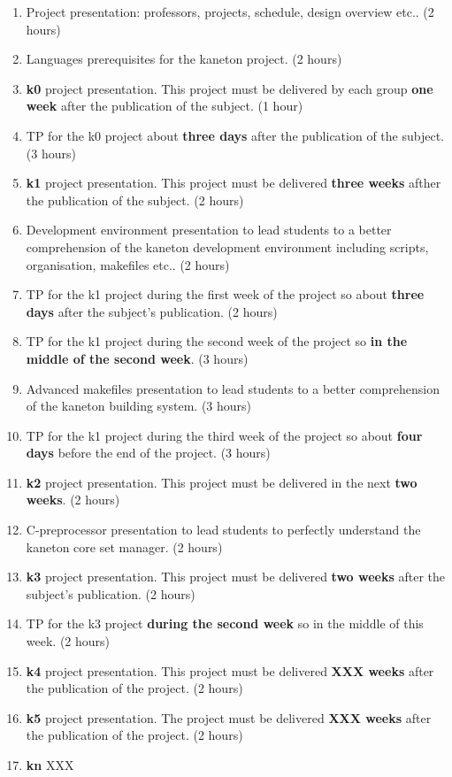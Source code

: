 \begin{multicols}{2}
\begin{enumerate}
  \item
    Project presentation: professors, projects, schedule, design overview
    etc.. (2 hours)
  \item
    Languages prerequisites for the kaneton project. (2 hours)
  \item
    \textbf{k0} project presentation. This project must be delivered by
    each group \textbf{one week} after the publication of the
    subject. (1 hour)
  \item
    TP for the k0 project about \textbf{three days} after the publication of
    the subject. (3 hours)
  \item
    \textbf{k1} project presentation. This project must be delivered
    \textbf{three weeks} afther the publication of the subject. (2 hours)
  \item
    Development environment presentation to lead students to a better
    comprehension of the kaneton development environment including scripts,
    organisation, makefiles etc.. (2 hours)
  \item
    TP for the k1 project during the first week of the project so about
    \textbf{three days} after the subject's publication. (2 hours)
  \item
    TP for the k1 project during the second week of the project so
    \textbf{in the middle of the second week}. (3 hours)
  \item
    Advanced makefiles presentation to lead students to a better
    comprehension of the kaneton building system. (3 hours)
  \item
    TP for the k1 project during the third week of the project so about
    \textbf{four days} before the end of the project. (3 hours)
  \item
    \textbf{k2} project presentation. This project must be delivered
    in the next \textbf{two weeks}. (2 hours)
  \item
    C-preprocessor presentation to lead students to perfectly understand
    the kaneton core set manager. (2 hours)
  \item
    \textbf{k3} project presentation. This project must be delivered
    \textbf{two weeks} after the subject's publication. (2 hours)
  \item
    TP for the k3 project \textbf{during the second week} so in the
    middle of this week. (2 hours)
  \item
    \textbf{k4} project presentation. This project must be delivered
    \textbf{XXX weeks} after the publication of the project. (2 hours)
  \item
    \textbf{k5} project presentation. The project must be delivered
    \textbf{XXX weeks} after the publication of the project. (2 hours)
  \item
    \textbf{kn} XXX
\end{enumerate}




\end{multicols}

